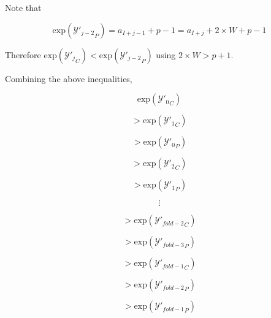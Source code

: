 \documentclass[12pt]{article}
\providecommand{\exp}{\ensuremath{\text{exp}}}
\theoremstyle{plain}
\numberwithin{equation}{section}
\begin{document}
    Note that

    \begin{equation*}
      \exp({\mathcal{Y}'_{j - 2}}_P) = a_{I + j - 1} + p - 1 = a_{I + j} + 2\times W + p - 1
    \end{equation*}

    Therefore $\exp({\mathcal{Y}'_j}_C) < \exp({\mathcal{Y}'_{j - 2}}_P)$ using $2 \times W > p + 1$.

    Combining the above inequalities,

    \begin{equation*}
    \exp({\mathcal{Y}'_0}_C)
    \end{equation*}

    \begin{equation*}
    > \exp({\mathcal{Y}'_1}_C)
    \end{equation*}

    \begin{equation*}
    > \exp({\mathcal{Y}'_0}_P)
    \end{equation*}

    \begin{equation*}
    > \exp({\mathcal{Y}'_2}_C)
    \end{equation*}

    \begin{equation*}
    > \exp({\mathcal{Y}'_1}_P)
    \end{equation*}

    \begin{equation*}
    \vdots
    \end{equation*}

    \begin{equation*}
    > \exp({\mathcal{Y}'_{fold - 2}}_C)
    \end{equation*}

    \begin{equation*}
    > \exp({\mathcal{Y}'_{fold - 3}}_P)
    \end{equation*}

    \begin{equation*}
    > \exp({\mathcal{Y}'_{fold - 1}}_C)
    \end{equation*}

    \begin{equation*}
    > \exp({\mathcal{Y}'_{fold - 2}}_P)
    \end{equation*}

    \begin{equation*}
    > \exp({\mathcal{Y}'_{fold - 1}}_P)
    \end{equation*}
\end{document}
